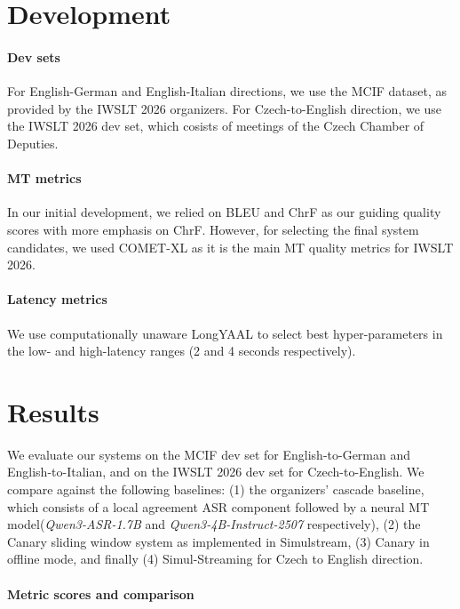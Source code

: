 \documentclass[11pt]{article}
\begin{document}
\section{Development}
\label{sec:dev}
\paragraph{Dev sets} For English-German and English-Italian directions, we use the MCIF \citep{papi2025mcif} dataset, as provided by the IWSLT 2026 organizers. For Czech-to-English direction, we use the
IWSLT 2026 dev set, which cosists of meetings of the Czech Chamber of Deputies.

\paragraph{MT metrics}
In our initial development, we relied on BLEU \cite{papineni-etal-2002-bleu} and ChrF \citep{popovic-2015-chrf} as our guiding quality scores with more emphasis on ChrF. However, for selecting the final system candidates, we used COMET-XL \citep{guerreiro-etal-2024-xcomet} as it is the main MT quality metrics for IWSLT 2026.
\paragraph{Latency metrics}
We use computationally unaware LongYAAL \citep{polk2025better} to select best hyper-parameters in the low- and high-latency ranges (2 and 4 seconds respectively).



\section{Results}
We evaluate our systems on the MCIF dev set for English-to-German and English-to-Italian, and on the IWSLT 2026 dev set for Czech-to-English. We compare against the following baselines: (1) the organizers' cascade baseline, which consists of a local agreement ASR component followed by a neural MT model(\textit{Qwen3-ASR-1.7B}\citep{shi2026qwenasr} and \textit{Qwen3-4B-Instruct-2507}\citep{yang2025qwen} respectively), (2) the Canary sliding window system as implemented in Simulstream, (3) Canary in offline mode, and finally (4) Simul-Streaming for Czech to English direction.

\paragraph{Metric scores and comparison}
\end{document}
